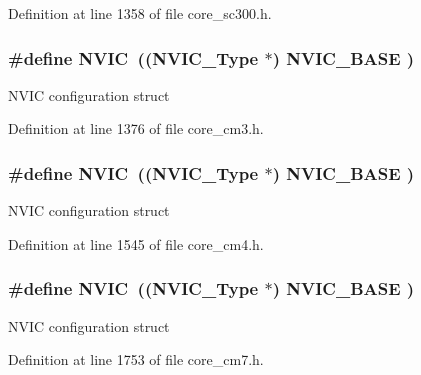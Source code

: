 Definition at line 1358 of file core\+\_\+sc300.\+h.

\subsubsection[{\texorpdfstring{N\+V\+IC}{NVIC}}]{\setlength{\rightskip}{0pt plus 5cm}\#define N\+V\+IC~(({\bf N\+V\+I\+C\+\_\+\+Type}      $\ast$)     {\bf N\+V\+I\+C\+\_\+\+B\+A\+SE}     )}\hypertarget{group___c_m_s_i_s__core__base_gac8e97e8ce56ae9f57da1363a937f8a17}{}\label{group___c_m_s_i_s__core__base_gac8e97e8ce56ae9f57da1363a937f8a17}
N\+V\+IC configuration struct 

Definition at line 1376 of file core\+\_\+cm3.\+h.

\subsubsection[{\texorpdfstring{N\+V\+IC}{NVIC}}]{\setlength{\rightskip}{0pt plus 5cm}\#define N\+V\+IC~(({\bf N\+V\+I\+C\+\_\+\+Type}      $\ast$)     {\bf N\+V\+I\+C\+\_\+\+B\+A\+SE}     )}\hypertarget{group___c_m_s_i_s__core__base_gac8e97e8ce56ae9f57da1363a937f8a17}{}\label{group___c_m_s_i_s__core__base_gac8e97e8ce56ae9f57da1363a937f8a17}
N\+V\+IC configuration struct 

Definition at line 1545 of file core\+\_\+cm4.\+h.

\subsubsection[{\texorpdfstring{N\+V\+IC}{NVIC}}]{\setlength{\rightskip}{0pt plus 5cm}\#define N\+V\+IC~(({\bf N\+V\+I\+C\+\_\+\+Type}      $\ast$)     {\bf N\+V\+I\+C\+\_\+\+B\+A\+SE}     )}\hypertarget{group___c_m_s_i_s__core__base_gac8e97e8ce56ae9f57da1363a937f8a17}{}\label{group___c_m_s_i_s__core__base_gac8e97e8ce56ae9f57da1363a937f8a17}
N\+V\+IC configuration struct 

Definition at line 1753 of file core\+\_\+cm7.\+h.

